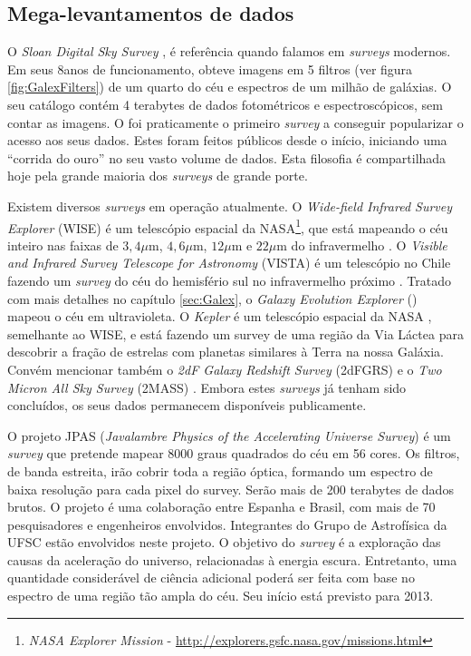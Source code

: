 \subsection{Mega-levantamentos de dados}

O {\em Sloan Digital Sky Survey} \citep[\SDSS]{York2000}, é referência quando
falamos em {\em surveys} modernos. Em seus 8\fixme anos de funcionamento, obteve
imagens em 5 filtros (ver figura \ref{fig:GalexFilters}) de um quarto do céu e
espectros de um milhão de galáxias. O seu catálogo contém 4 terabytes de dados
fotométricos e espectroscópicos, sem contar as imagens. O \SDSS foi praticamente
o primeiro {\em survey} a conseguir popularizar o acesso aos seus dados. Estes
foram feitos públicos desde o início\citneed, iniciando uma ``corrida do ouro''
no seu vasto volume de dados. Esta filosofia é compartilhada hoje pela grande
maioria dos {\em surveys} de grande porte.

Existem diversos {\em surveys} em operação atualmente. O {\em Wide-field
Infrared Survey Explorer} (WISE) é um telescópio espacial da NASA\footnote{{\em
NASA Explorer Mission} - \url{http://explorers.gsfc.nasa.gov/missions.html}},
que está mapeando o céu inteiro nas faixas de $3,4\mu$m, $4,6\mu$m, $12\mu$m e
$22\mu$m do infravermelho \citep{Wright2010}. O {\em Visible and Infrared Survey
Telescope for Astronomy} (VISTA) é um telescópio no Chile fazendo um {\em
survey} do céu do hemisfério sul no infravermelho próximo \citep{Born2010}.
Tratado com mais detalhes no capítulo \ref{sec:Galex}, o {\em Galaxy Evolution
Explorer} (\galex) mapeou o céu em ultravioleta. O {\em Kepler} é um telescópio
espacial da NASA \citep{Borucki2010}, semelhante ao WISE, e está fazendo um
survey de uma região da Via Láctea para descobrir a fração de estrelas com
planetas similares à Terra na nossa Galáxia. Convém mencionar também o {\em 2dF
Galaxy Redshift Survey} (2dFGRS) \citep{Colless1999} e o {\em Two Micron All Sky
Survey} (2MASS) \citep{Skrutskie2006}. Embora estes {\em surveys} já tenham sido
concluídos, os seus dados permanecem disponíveis publicamente.

O projeto JPAS ({\em Javalambre Physics of the Accelerating Universe Survey}) é
um {\em survey} que pretende mapear $8000$ graus quadrados do céu em 56
cores\citep{Benitez2009}. Os filtros, de banda estreita, irão cobrir toda a
região óptica, formando um espectro de baixa resolução para cada pixel do
survey. Serão mais de 200 terabytes de dados brutos\citneed. O projeto é uma
colaboração entre Espanha e Brasil, com mais de 70 pesquisadores e engenheiros
envolvidos. Integrantes do Grupo de Astrofísica da UFSC estão envolvidos neste
projeto\citneed. O objetivo do {\em survey} é a exploração das causas da
aceleração do universo, relacionadas à energia escura. Entretanto, uma
quantidade considerável de ciência adicional poderá ser feita com base no
espectro de uma região tão ampla do céu. Seu início está previsto para 2013.

